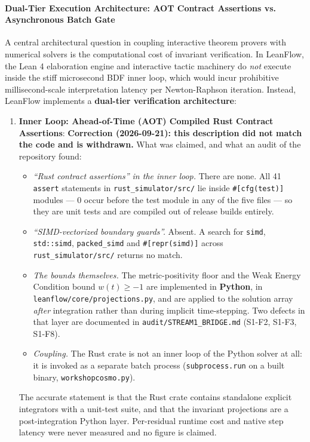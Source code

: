 \documentclass[11pt,a4paper]{article}
\begin{document}
\paragraph{Dual-Tier Execution Architecture: AOT Contract Assertions vs. Asynchronous Batch Gate}
A central architectural question in coupling interactive theorem provers with numerical solvers is the computational cost of invariant verification. In LeanFlow, the Lean 4 elaboration engine and interactive tactic machinery do \emph{not} execute inside the stiff microsecond BDF inner loop, which would incur prohibitive millisecond-scale interpretation latency per Newton-Raphson iteration. Instead, LeanFlow implements a \textbf{dual-tier verification architecture}:
\begin{enumerate}
    \item \textbf{Inner Loop: Ahead-of-Time (AOT) Compiled Rust Contract Assertions}:
    \textbf{Correction (2026-09-21): this description did not match the code and is withdrawn.} What was claimed, and what an audit of the repository found:
    \begin{itemize}
        \item \emph{``Rust contract assertions'' in the inner loop.} There are none. All 41 \texttt{assert} statements in \texttt{rust\_simulator/src/} lie inside \texttt{\#[cfg(test)]} modules --- 0 occur before the test module in any of the five files --- so they are unit tests and are compiled out of release builds entirely.
        \item \emph{``SIMD-vectorized boundary guards''.} Absent. A search for \texttt{simd}, \texttt{std::simd}, \texttt{packed\_simd} and \texttt{\#[repr(simd)]} across \texttt{rust\_simulator/src/} returns no match.
        \item \emph{The bounds themselves.} The metric-positivity floor and the Weak Energy Condition bound $w(t)\ge-1$ are implemented in \textbf{Python}, in \texttt{leanflow/core/projections.py}, and are applied to the solution array \emph{after} integration rather than during implicit time-stepping. Two defects in that layer are documented in \texttt{audit/STREAM1\_BRIDGE.md} (S1-F2, S1-F3, S1-F8).
        \item \emph{Coupling.} The Rust crate is not an inner loop of the Python solver at all: it is invoked as a separate batch process (\texttt{subprocess.run} on a built binary, \texttt{workshopcosmo.py}).
    \end{itemize}
    The accurate statement is that the Rust crate contains standalone explicit integrators with a unit-test suite, and that the invariant projections are a post-integration Python layer. Per-residual runtime cost and native step latency were never measured and no figure is claimed.


\end{enumerate}
\end{document}
